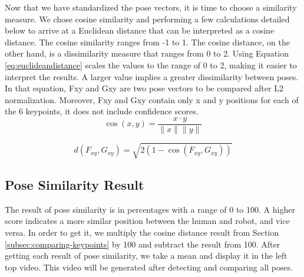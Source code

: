 Now that we have standardized the pose vectors, it is time to choose a similarity measure. We chose cosine similarity and performing a few calculations detailed below to arrive at a Euclidean distance that can be interpreted as a cosine distance.
The cosine similarity ranges from -1 to 1. The cosine distance, on the other hand, is a dissimilarity measure that ranges from 0 to 2.
Using Equation \ref{eq:euclideandistance} scales the values to the range of 0 to 2, making it easier to interpret the results. A larger value implies a greater dissimilarity between poses. In that equation, Fxy and Gxy are two pose vectors to be compared after L2 normalization. Moreover, Fxy and Gxy contain only x and y positions for each of the 6 keypoints, it does not include confidence scores.
\begin{equation} 
  \label{eq:cosinesimilarity}
  \cos(x,y) = \frac{x \cdot y}{\|x\| \|y\|}
\end{equation}

\begin{equation}
  \label{eq:euclideandistance}
  d(F_{xy}, G_{xy}) = \sqrt{2 (1 - \cos(F_{xy}, G_{xy}))}
\end{equation}


\subsection{Pose Similarity Result}
\label{subsec:pose-similarity-result}

The result of pose similarity is in percentages with a range of 0 to 100. A higher score indicates a more similar position between the human and robot, and vice versa.
In order to get it, we multiply the cosine distance result from Section \ref{subsec:comparing-keypoints} by 100 and subtract the result from 100.
After getting each result of pose similarity, we take a mean and display it in the left top video. This video will be generated after detecting and comparing all poses.